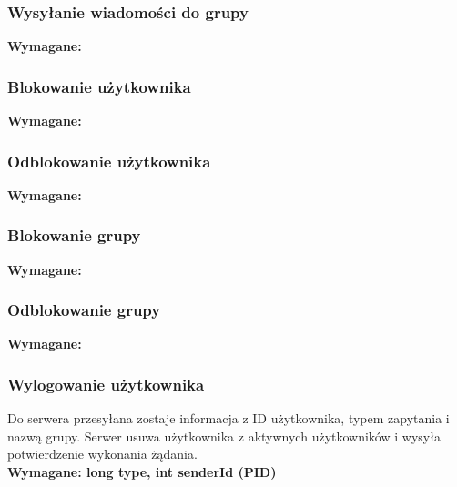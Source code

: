 \documentclass[11pt]{article}
\begin{document}
	\subsubsection{Wysyłanie wiadomości do grupy}
	\textbf{Wymagane:}
	\subsubsection{Blokowanie użytkownika}
	\textbf{Wymagane:}
	\subsubsection{Odblokowanie użytkownika}
	\textbf{Wymagane:}
	\subsubsection{Blokowanie grupy}
	\textbf{Wymagane:}
	\subsubsection{Odblokowanie grupy}
	\textbf{Wymagane:}
	\subsubsection{Wylogowanie użytkownika}
	Do serwera przesyłana zostaje informacja z ID użytkownika, typem zapytania i nazwą grupy. Serwer usuwa użytkownika z aktywnych użytkowników i wysyła potwierdzenie wykonania żądania.\\
	\textbf{Wymagane: long type, int senderId (PID)}
	
\end{document}
